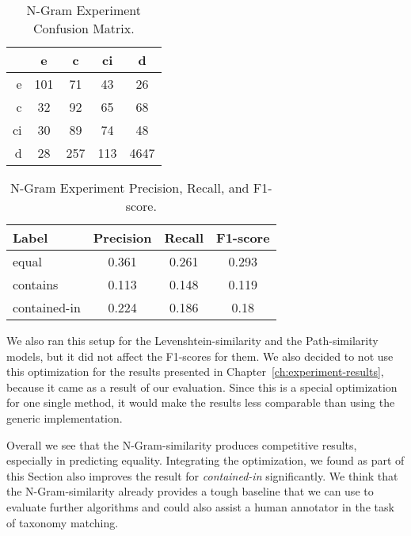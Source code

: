 \begin{table}[htbp]
    \begin{center}
        \begin{tabular}{r|cccc}
            & e & c & ci & d \\
            \hline
            e & 101 & 71 & 43 & 26 \\
            c & 32 & 92 & 65 & 68 \\
            ci & 30 & 89 & 74 & 48 \\
            d & 28 & 257 & 113 & 4647 \\
        \end{tabular}
        \caption{N-Gram Experiment Confusion Matrix.}
        \label{tab:ngram-experiment-cm}
    \end{center}
\end{table}

\begin{table}[htbp]
    \begin{center}
        \begin{tabular}{l|ccc}
            Label & Precision & Recall & F1-score \\
            \hline
            equal & 0.361 & 0.261 & 0.293 \\
            contains & 0.113 & 0.148 & 0.119 \\
            contained-in & 0.224 & 0.186 & 0.18 \\
        \end{tabular}
        \caption{N-Gram Experiment Precision, Recall, and F1-score.}
        \label{tab:ngram-experiment-evaluation}
    \end{center}
\end{table}

We also ran this setup for the Levenshtein-similarity and the Path-similarity models, but it did not affect the
F1-scores for them.
We also decided to not use this optimization for the results presented in Chapter~\ref{ch:experiment-results},
because it came as a result of our evaluation.
Since this is a special optimization for one single method, it would make the results less comparable than using the
generic implementation.

Overall we see that the N-Gram-similarity produces competitive results, especially in predicting equality.
Integrating the optimization, we found as part of this Section also improves the result for \emph{contained-in} significantly.
We think that the N-Gram-similarity already provides a tough baseline that we can use to evaluate further algorithms and
could also assist a human annotator in the task of taxonomy matching.

